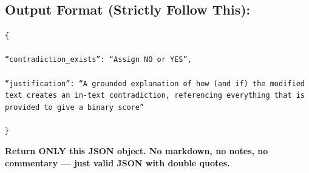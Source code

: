 \documentclass[11pt]{article}
\begin{document}
\begin{tcolorbox}[breakable,colback=lightestgray,colframe=black,title=\textbf{In-Text LLM Validation Prompt}]
\subsection*{\textbf{Output Format (Strictly Follow This):}}

{\small
\texttt{\{\\\\
``contradiction\_exists'': ``Assign NO or YES'',\\\\
``justification'': ``A grounded explanation of how (and if) the modified text creates an in-text contradiction, referencing everything that is provided to give a binary score''\\\\
\}}
}

\textbf{Return ONLY this JSON object. No markdown, no notes, no commentary — just valid JSON with double quotes.}
\end{tcolorbox}
\end{document}
